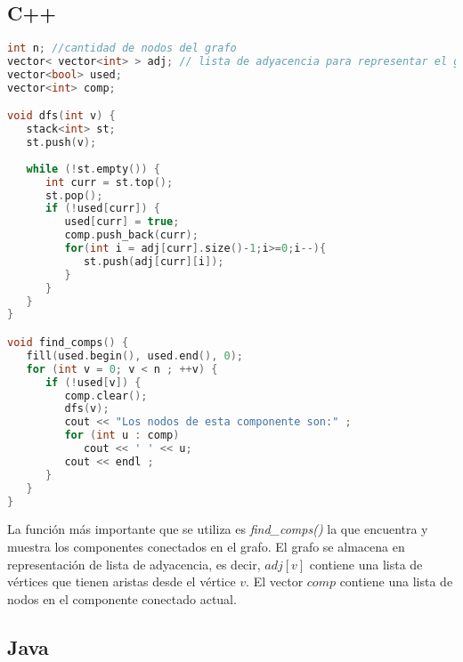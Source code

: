 \subsection{C++}
\begin{lstlisting}[language=C++]
int n; //cantidad de nodos del grafo
vector< vector<int> > adj; // lista de adyacencia para representar el grafo
vector<bool> used;
vector<int> comp;

void dfs(int v) {
   stack<int> st;
   st.push(v);
	
   while (!st.empty()) {
      int curr = st.top();
      st.pop();
      if (!used[curr]) {
         used[curr] = true;
         comp.push_back(curr);
         for(int i = adj[curr].size()-1;i>=0;i--){
            st.push(adj[curr][i]);
         }
      }
   }
}

void find_comps() {
   fill(used.begin(), used.end(), 0);
   for (int v = 0; v < n ; ++v) {
      if (!used[v]) {
         comp.clear();
         dfs(v);
         cout << "Los nodos de esta componente son:" ;
         for (int u : comp)
            cout << ' ' << u;
         cout << endl ;
      }
   }
}
\end{lstlisting}


La función más importante que se utiliza es \emph{find\_comps()} la que encuentra y muestra los componentes conectados en el grafo. El grafo se almacena en representación de lista de adyacencia, es decir, $adj[v]$ contiene una lista de vértices que tienen aristas desde el vértice $v$. El vector $comp$ contiene una lista de nodos en el componente conectado actual.




\subsection{Java}

